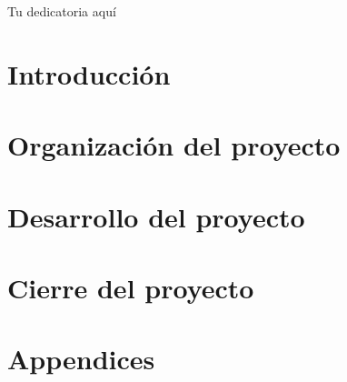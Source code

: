 \documentclass[titlepage,openright,twoside,a4paper,draft,12pt,spanish]{book}
\author{Nombre del Alumno}{Grado en Ingeniería Informática - Especialidad}{D.~}{12345678A}
\begin{document}
\makeTitlePage

\pagestyle{empty}
\begin{dedication}
Tu dedicatoria aquí
\end{dedication}
\pagestyle{trinidadPhD}




\tableofcontents
\listoffigures
\listoftables
\listoftodos
\newpage



\lineNumbersOn
\part{Introducción}



\part{Organización del proyecto}




\part{Desarrollo del proyecto}




\part{Cierre del proyecto}






\part{Appendices}
\appendix



\lineNumbersOff

\printglossaries
\newpage



\end{document}
